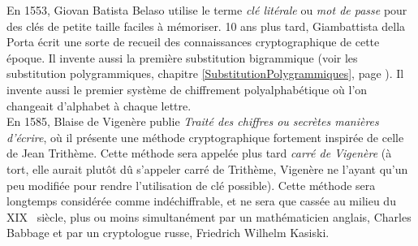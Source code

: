 



En 1553, Giovan Batista Belaso utilise le terme \emph{clé
  litérale} ou \emph{mot de passe} pour des clés de petite taille
faciles à mémoriser. %
10 ans plus tard, Giambattista della Porta écrit une sorte
de recueil des connaissances cryptographique de cette époque. Il
invente aussi la première substitution bigrammique (voir les
substitution polygrammiques, chapitre
\ref{SubstitutionPolygrammiques}, page
\pageref{SubstitutionPolygrammiques}). Il invente aussi le premier
système de chiffrement polyalphabétique où l'on changeait d'alphabet à
chaque lettre. \\

En 1585, Blaise de Vigenère publie \emph{Traité des chiffres
  ou secrètes manières d'écrire}, où il présente une méthode
cryptographique fortement inspirée de celle de Jean Trithème. Cette
méthode sera appelée plus tard \emph{carré de Vigenère} (à tort,
elle aurait plutôt dû s'appeler carré de Trithème, Vigenère ne
l'ayant qu'un peu modifiée pour rendre l'utilisation de clé possible).
Cette méthode sera longtemps considérée comme indéchiffrable, et ne
sera que cassée au milieu du XIX\ieme~ siècle, plus ou moins
simultanément par un mathématicien anglais, Charles Babbage et
par un cryptologue russe, Friedrich Wilhelm Kasiski. \\

